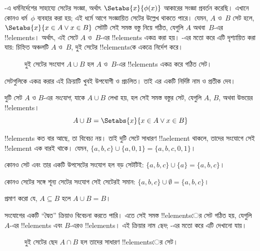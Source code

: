 \documentclass[../../../include/open-logic-section]{subfiles}
\begin{document}

\begin{explain}
-এ ধর্মনির্দেশের সাহায্যে সেটের সংজ্ঞা,
অর্থাৎ $\Setabs{x}{\phi(x)}$ আকারের সংজ্ঞা প্রবর্তন করেছি। এখানে
কোনও ধর্ম~$\phi$ ব্যবহার করা হয়; এই ধর্মে আগে সংজ্ঞায়িত সেটের উল্লেখ
থাকতে পারে। যেমন, $A$ ও~$B$ সেট হলে,
$\Setabs{x}{x \in A \lor x \in B}$ সেটটি সেই সমস্ত বস্তু নিয়ে গঠিত,
যেগুলি $A$ অথবা~$B$-এর !!{element}s। অর্থাৎ, এই সেটে $A$ ও~$B$-এর
!!{element}s একত্র করা হয়। -এর মতো করে এটি
দৃশ্যায়িত করা যায়: চিহ্নিত অঞ্চলটি $A$ ও~$B$, দুই সেটের
!!{element}sকে একত্রে নির্দেশ করে।

\begin{figure}
  \caption{দুই সেটের সংযোগ $A \cup B$ হল $A$ ও~$B$-এর
    !!{element}s একত্র করে গঠিত সেট।}
\end{figure}

সেটগুলিকে একত্র করার এই ক্রিয়াটি খুবই উপযোগী ও প্রচলিত।
তাই এর একটি নির্দিষ্ট নাম ও প্রতীক দেব।
\end{explain}

\begin{defn}[সংযোগ]
দুটি সেট $A$ ও $B$-এর \emph{সংযোগ}, যাকে $A \cup B$ লেখা হয়,
হল সেই সমস্ত বস্তুর সেট, যেগুলি $A$, $B$, অথবা উভয়ের !!{element}s।
\[
A \cup B = \Setabs{x}{x \in A \lor x \in B}
\]
\end{defn}

\begin{ex}
!!{element}s কত বার আছে, তা বিবেচ্য নয়। তাই দুটি সেটে সাধারণ
!!a{element} থাকলে, তাদের সংযোগে সেই !!{element} এক বারই থাকে।
যেমন, $\{ a, b, c\} \cup \{ a, 0, 1\} = \{a, b, c, 0, 1\}$।

কোনও সেট এবং তার একটি উপসেটের সংযোগ হল বড় সেটটিই:
$\{a, b, c \} \cup \{a \} = \{a, b, c\}$।

কোনও সেটের সঙ্গে শূন্য সেটের সংযোগ সেই সেটেরই সমান:
$\{a, b, c \} \cup \emptyset = \{a, b, c \}$।
\end{ex}

\begin{prob}
প্রমাণ করো যে, $A \subseteq B$ হলে $A \cup B = B$।
\end{prob}

\begin{explain}
সংযোগের একটি ``দ্বৈত'' ক্রিয়াও বিবেচনা করতে পারি। এতে সেই সমস্ত
!!{element}sের সেট গঠিত হয়, যেগুলি $A$-এর !!{element}s এবং
$B$-এরও !!{element}s। এই ক্রিয়ার নাম \emph{ছেদ};
-এর মতো করে এটি দেখানো যায়।
\begin{figure}
  \caption{দুই সেটের ছেদ $A \cap B$ হল তাদের সাধারণ
    !!{element}sের সেট।}
\end{figure}
\end{explain}
\end{document}
